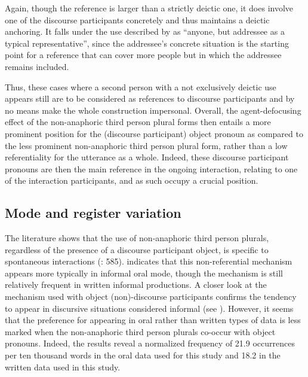 \documentclass[output=paper]{langscibook}
\begin{document}
Again, though the reference is larger than a strictly deictic one, it does involve one of the discourse participants concretely and thus maintains a deictic anchoring. It falls under the use described by \citet[89]{Kluge2012} as “anyone, but addressee as a typical representative”, since the addressee’s concrete situation is the starting point for a reference that can cover more people but in which the addressee remains included.  


Thus, these cases where a second person with a not exclusively deictic use appears still are to be considered as references to discourse participants and by no means make the whole construction impersonal. Overall, the agent-defocusing effect of the non-anaphoric third person plural forms then entails a more prominent position for the (discourse participant) object pronoun as compared to the less prominent non-anaphoric third person plural form, rather than a low referentiality for the utterance as a whole. Indeed, these discourse participant pronouns are then the main reference in the ongoing interaction, relating to one of the interaction participants, and as such occupy a crucial position.



\subsection{Mode and register variation}\label{sec:pierre:4.3}

The literature shows that the use of non-anaphoric third person plurals, regardless of the presence of a discourse participant object, is specific to spontaneous interactions (\citealt{SiewierskaPapastathi2011}: 585). \citet[118]{Pierre2021} indicates that this non-referential mechanism appears more typically in informal oral mode, though the mechanism is still relatively frequent in written informal productions. A closer look at the mechanism used with object (non)-discourse participants confirms the tendency to appear in discursive situations considered informal (see ). However, it seems that the preference for appearing in oral rather than written types of data is less marked when the non-anaphoric third person plurals co-occur with object pronouns. Indeed, the results reveal a normalized frequency of 21.9 occurrences per ten thousand words in the oral data used for this study and 18.2 in the written data used in this study. 
\end{document}
